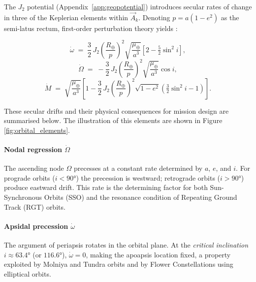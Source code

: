 The $J_2$ potential (Appendix~\ref{app:geopotential}) introduces secular rates of change in three of the Keplerian elements within $\vec{A}_k$. Denoting $p = a(1 - e^2)$ as the semi-latus rectum, first-order perturbation theory yields \cite{valladoFundamentalsAstrodynamicsApplications2001}:

\begin{equation}
    \dot{\omega} \;=\; \frac{3}{2}\,J_2
        \left(\frac{R_{\oplus}}{p}\right)^{\!2}
        \sqrt{\frac{\mu_{\oplus}}{a^3}}
        \left[2 - \tfrac{5}{2}\sin^2 i\right],
    \label{eq:dot_omega}
\end{equation}
\begin{equation}
    \dot{\Omega} \;=\; -\frac{3}{2}\,J_2
        \left(\frac{R_{\oplus}}{p}\right)^{\!2}
        \sqrt{\frac{\mu_{\oplus}}{a^3}}
        \cos i,
    \label{eq:dot_Omega}
\end{equation}
\begin{equation}
    \dot{M} \;=\; \sqrt{\frac{\mu_{\oplus}}{a^3}}
        \left[1 - \frac{3}{2}\,J_2
            \left(\frac{R_{\oplus}}{p}\right)^{\!2}
            \sqrt{1 - e^2}
            \left(\tfrac{3}{2}\sin^2 i - 1\right)\right].
    \label{eq:dot_M}
\end{equation}

These secular drifts and their physical consequences for mission design are summarised below. The illustration of this elements are shown in Figure \ref{fig:orbital_elements}.

\paragraph{\textbf{Nodal regression} $\dot{\Omega}$ }
 The ascending node $\Omega$ precesses at a constant rate determined by $a$, $e$, and $i$. For prograde orbits ($i < 90°$) the precession is westward; retrograde orbits ($i > 90°$) produce eastward drift. This rate is the determining factor for both Sun-Synchronous Orbits (SSO) and the resonance condition of Repeating Ground Track (RGT) orbits.
\paragraph{\textbf{Apsidal precession} $\dot{\omega}$}
 The argument of periapsis rotates in the orbital plane. At the \emph{critical inclination} $i \approx 63.4°$ (or $116.6°$), $\dot{\omega} = 0$, making the apoapsis location fixed, a property exploited by Molniya and Tundra orbits and by Flower Constellations using elliptical orbits.

